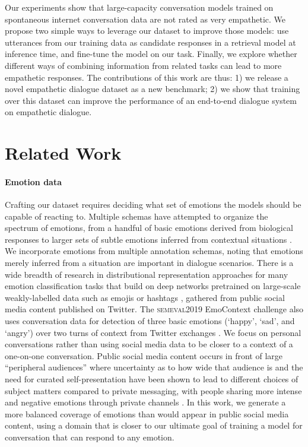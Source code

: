 \documentclass[11pt,a4paper]{article}
\begin{document}
Our experiments show that large-capacity conversation models trained on spontaneous internet conversation data are not rated as very empathetic. We propose two simple ways to leverage our dataset to improve those models: use utterances from our training data as candidate responses in a retrieval model at inference time, and fine-tune the model on our task.
Finally, we explore whether different ways of combining information from related tasks can lead to more empathetic responses.
The contributions of this work are thus: 1) we release a novel empathetic dialogue dataset as a new benchmark; 2) we show that training over this dataset can improve the performance of an end-to-end dialogue system on empathetic dialogue.

\section{Related Work}

\paragraph{Emotion data} Crafting our dataset requires deciding what set of emotions the models should be capable of reacting to. 
Multiple schemas have attempted to organize the spectrum of emotions, from a handful of basic emotions derived from biological responses \citep{ekman1992argument,plutchik1984emotions} 
to larger sets of subtle emotions inferred from contextual situations \citep{SkerrySaxe}.
We incorporate emotions from multiple annotation schemas, noting that emotions merely
inferred from a situation are important in dialogue scenarios.  
There is a wide breadth of research in distributional representation approaches for many emotion classification tasks \citep{duppada2018seernet,park2018plusemo2vec,xu2018emo2vec,Mohammad2018SemEval2018T1} that build on
deep networks pretrained on large-scale weakly-labelled data such as emojis \citep{Deepmoji} or hashtags \citep{MohammadDataset}, gathered from public social media content published on Twitter.
The \textsc{semeval2019} EmoContext challenge also uses conversation data for detection of three basic emotions (`happy', `sad', and `angry')
over two turns of context
from Twitter exchanges
\citep{gupta2017sentiment}.  
We focus on personal conversations rather than using social media data 
to be closer to a context of a one-on-one conversation. 
Public social media content occurs in front of large ``peripheral audiences'' \citep{goffman1981forms} 
where
uncertainty as to how wide that audience is and the need for curated self-presentation \citep{goffman1959presentation} have been
shown to lead to different choices of subject matters
compared to private messaging, with people
sharing more intense and negative emotions
through private channels \citep{bazarova2015social,litt2014awkward}. 
In this work, we generate a more balanced
coverage of emotions than would appear in public social
media content, using a domain that is closer
to our ultimate goal of training a model for conversation that can respond to any emotion.
\end{document}
